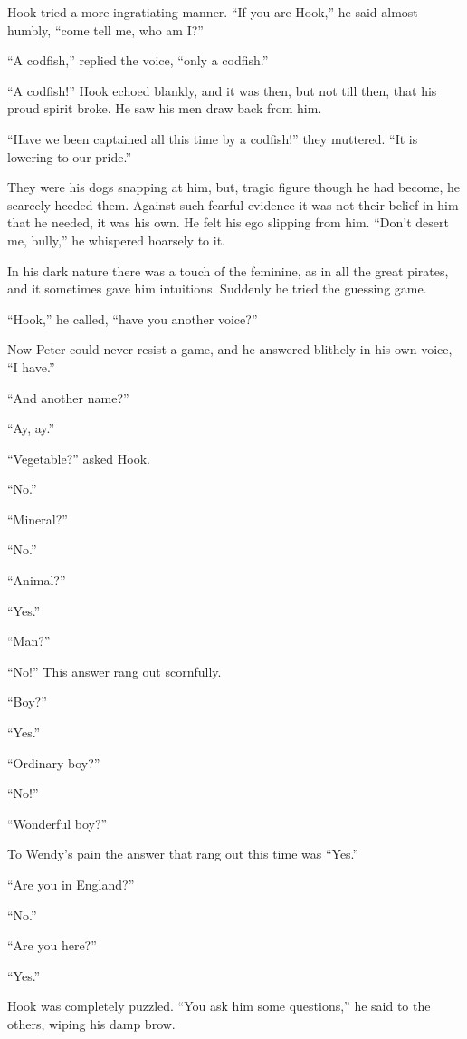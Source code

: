 Hook tried a more ingratiating manner. ``If you are Hook,'' he said
almost humbly, ``come tell me, who am I?''

``A codfish,'' replied the voice, ``only a codfish.''

``A codfish!'' Hook echoed blankly, and it was then, but not till then,
that his proud spirit broke. He saw his men draw back from him.

``Have we been captained all this time by a codfish!'' they muttered. ``It
is lowering to our pride.''

They were his dogs snapping at him, but, tragic figure though he had
become, he scarcely heeded them. Against such fearful evidence it was
not their belief in him that he needed, it was his own. He felt his ego
slipping from him. ``Don't desert me, bully,'' he whispered hoarsely to
it.

In his dark nature there was a touch of the feminine, as in all the
great pirates, and it sometimes gave him intuitions. Suddenly he tried
the guessing game.

``Hook,'' he called, ``have you another voice?''

Now Peter could never resist a game, and he answered blithely in his
own voice, ``I have.''

``And another name?''

``Ay, ay.''

``Vegetable?'' asked Hook.

``No.''

``Mineral?''

``No.''

``Animal?''

``Yes.''

``Man?''

``No!'' This answer rang out scornfully.

``Boy?''

``Yes.''

``Ordinary boy?''

``No!''

``Wonderful boy?''

To Wendy's pain the answer that rang out this time was ``Yes.''

``Are you in England?''

``No.''

``Are you here?''

``Yes.''

Hook was completely puzzled. ``You ask him some questions,'' he said to
the others, wiping his damp brow.

